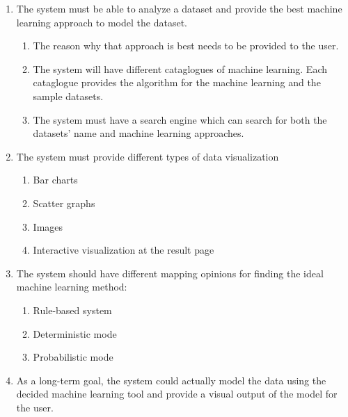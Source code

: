 \documentclass[titlepage]{article}
\begin{document}
\begin{enumerate}
  \item The system must be able to analyze a dataset and provide the best machine learning approach to model the dataset.
  \begin{enumerate}
    \item The reason why that approach is best needs to be provided to the user.
  
    \item The system will have different cataglogues of machine learning. Each cataglogue provides the algorithm for the machine learning and the sample datasets.
    
    \item The system must have a search engine which can search for both the datasets' name and machine learning approaches.
  \end{enumerate}
  
  \item The system must provide different types of data visualization
  \begin{enumerate}
    \item Bar charts
    \item Scatter graphs
    \item Images 
    \item Interactive visualization at the result page
  \end{enumerate}
  
  \item The system should have different mapping opinions for finding the ideal machine learning method:
  \begin{enumerate}
    \item Rule-based system
    \item Deterministic mode
    \item Probabilistic mode
  \end{enumerate} 

  \item As a long-term goal, the system could actually model the data using the decided machine learning tool and provide a visual output of the model for the user.
\end{enumerate}
\end{document}
